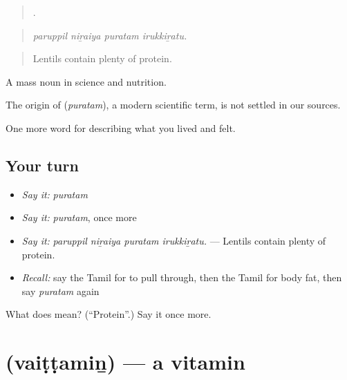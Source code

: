 \begin{quote}
   .
\end{quote}

\begin{quote}
\emph{paruppil niṟaiya puratam irukkiṟatu.}
\end{quote}

\begin{quote}
Lentils contain plenty of protein.
\end{quote}

A mass noun in science and nutrition.

\begin{cousinweb}
The origin of \textbf{} (\emph{puratam}), a modern scientific term, is not settled in our sources.
\end{cousinweb}

\begin{grammarlens}[title={What you've built}]
One more word for describing what you lived and felt.
\end{grammarlens}

\subsection*{Your turn}
\begin{itemize}
\raggedright
  \item \emph{Say it:} \emph{puratam}
  \item \emph{Say it:} \emph{puratam}, once more
  \item \emph{Say it:} \emph{paruppil niṟaiya puratam irukkiṟatu.} — Lentils contain plenty of protein.
  \item \emph{Recall:} say the Tamil for to pull through, then the Tamil for body fat, then say \emph{puratam} again
\end{itemize}

\begin{tcolorbox}[breakable,colback=teal!4,colframe=teal!35!black,title={Before you move on}]
What does  mean? (\textquotedblleft{}Protein\textquotedblright{}.) Say it once more.
\end{tcolorbox}
\section[\texorpdfstring{\ta{வைட்டமின்} (vaiṭṭamiṉ)}{வைட்டமின் (vaiṭṭamiṉ)}]{ (vaiṭṭamiṉ) — a vitamin}

\label{lesson:TA-C487-vaittamin}



